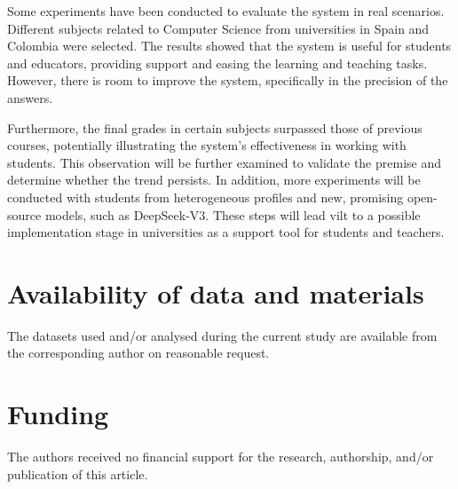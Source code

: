 \documentclass[pdflatex,sn-mathphys-num]{sn-jnl}%
\begin{document}
Some experiments have been conducted to evaluate the system in real scenarios. Different subjects related to Computer Science from universities in Spain and Colombia were selected. The results showed that the system is useful for students and educators, providing support and easing the learning and teaching tasks. However, there is room to improve the system, specifically in the precision of the answers. 

Furthermore, the final grades in certain subjects surpassed those of previous courses, potentially illustrating the system's effectiveness in working with students. This observation will be further examined to validate the premise and determine whether the trend persists. In addition, more experiments will be conducted with students from heterogeneous profiles and new, promising open-source models, such as DeepSeek-V$3$. These steps will lead \ac{vilt} to a possible implementation stage in universities as a support tool for students and teachers.

\section*{Availability of data and materials}
The datasets used and/or analysed during the current study are available from the corresponding author on reasonable request.

\section*{Funding}
The authors received no financial support for the research, authorship, and/or publication of this article.





\end{document}
